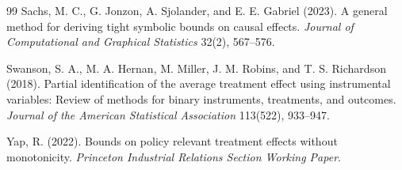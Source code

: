\documentclass[11pt]{article}
\theoremstyle{definition}
\theoremstyle{plain}
\theoremstyle{remark}
\begin{document}
\begin{thebibliography}{99}
Sachs, M. C., G. Jonzon, A. Sjolander, and E. E. Gabriel (2023).
A general method for deriving tight symbolic bounds on causal effects.
\emph{Journal of Computational and Graphical Statistics} 32(2), 567--576.

Swanson, S. A., M. A. Hernan, M. Miller, J. M. Robins, and T. S. Richardson
(2018). Partial identification of the average treatment effect using
instrumental variables: Review of methods for binary instruments, treatments,
and outcomes. \emph{Journal of the American Statistical Association}
113(522), 933--947.

Yap, R. (2022).
Bounds on policy relevant treatment effects without monotonicity.
\emph{Princeton Industrial Relations Section Working Paper}.
\end{thebibliography}
\end{document}
